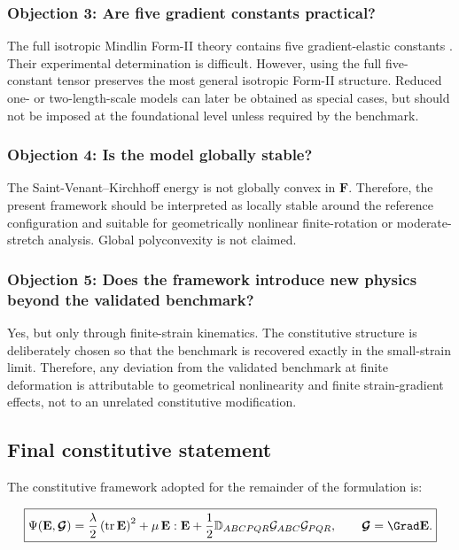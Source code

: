 \documentclass[11pt]{article}
\DeclareMathOperator{\tr}{tr}
\begin{document}
\subsubsection*{Objection 3: Are five gradient constants practical?}

The full isotropic Mindlin Form-II theory contains five gradient-elastic constants \cite{Mindlin1964,MindlinEshel1968,LazarPo2018}. Their experimental determination is difficult. However, using the full five-constant tensor preserves the most general isotropic Form-II structure. Reduced one- or two-length-scale models can later be obtained as special cases, but should not be imposed at the foundational level unless required by the benchmark.

\subsubsection*{Objection 4: Is the model globally stable?}

The Saint-Venant--Kirchhoff energy is not globally convex in $\mathbf{F}$. Therefore, the present framework should be interpreted as locally stable around the reference configuration and suitable for geometrically nonlinear finite-rotation or moderate-stretch analysis. Global polyconvexity is not claimed.

\subsubsection*{Objection 5: Does the framework introduce new physics beyond the validated benchmark?}

Yes, but only through finite-strain kinematics. The constitutive structure is deliberately chosen so that the benchmark is recovered exactly in the small-strain limit. Therefore, any deviation from the validated benchmark at finite deformation is attributable to geometrical nonlinearity and finite strain-gradient effects, not to an unrelated constitutive modification.

\subsection{Final constitutive statement}

The constitutive framework adopted for the remainder of the formulation is:

\begin{equation}
\boxed{
\Psi(\mathbf{E},\bm{\mathcal{G}})
=
\frac{\lambda}{2}\left(\tr\mathbf{E}\right)^2
+
\mu\,\mathbf{E}:\mathbf{E}
+
\frac{1}{2}
\mathbb{D}_{ABCPQR}
\mathcal{G}_{ABC}\mathcal{G}_{PQR},
\qquad
\bm{\mathcal{G}}=\Grad\mathbf{E}.
}
\label{eq:sec2_final_constitutive_framework}
\end{equation}
\end{document}
